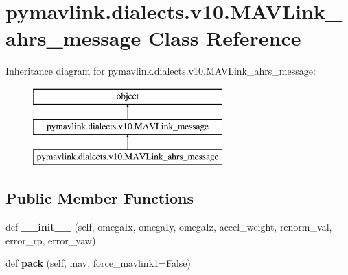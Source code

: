 \hypertarget{classpymavlink_1_1dialects_1_1v10_1_1MAVLink__ahrs__message}{}\section{pymavlink.\+dialects.\+v10.\+M\+A\+V\+Link\+\_\+ahrs\+\_\+message Class Reference}
\label{classpymavlink_1_1dialects_1_1v10_1_1MAVLink__ahrs__message}
Inheritance diagram for pymavlink.\+dialects.\+v10.\+M\+A\+V\+Link\+\_\+ahrs\+\_\+message\+:\begin{figure}[H]
\begin{center}
\leavevmode
\includegraphics[height=3.000000cm]{classpymavlink_1_1dialects_1_1v10_1_1MAVLink__ahrs__message}
\end{center}
\end{figure}
\subsection*{Public Member Functions}
\begin{DoxyCompactItemize}
\item 
\mbox{\label{classpymavlink_1_1dialects_1_1v10_1_1MAVLink__ahrs__message_a09c88901fbe6511feba1e0c70f505ab8}} 
def {\bfseries \+\_\+\+\_\+init\+\_\+\+\_\+} (self, omega\+Ix, omega\+Iy, omega\+Iz, accel\+\_\+weight, renorm\+\_\+val, error\+\_\+rp, error\+\_\+yaw)
\item 
\mbox{\label{classpymavlink_1_1dialects_1_1v10_1_1MAVLink__ahrs__message_ab4b2578479052c41dfbd308ec470f061}} 
def {\bfseries pack} (self, mav, force\+\_\+mavlink1=False)
\end{DoxyCompactItemize}
